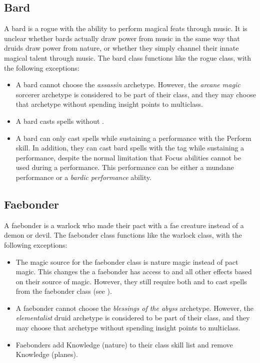     \subsection{Bard}
        A bard is a rogue with the ability to perform magical feats through music.
        It is unclear whether bards actually draw power from music in the same way that druids draw power from nature, or whether they simply channel their innate magical talent through music.
        The bard class functions like the rogue class, with the following exceptions:
        \begin{itemize}
            \item A bard cannot choose the \textit{assassin} archetype. However, the \textit{arcane magic} sorcerer archetype is considered to be part of their class, and they may choose that archetype without spending insight points to multiclass.
            \item A bard casts spells without .
            \item A bard can only cast spells while sustaining a performance with the Perform skill. In addition, they can cast bard spells with the  tag while sustaining a performance, despite the normal limitation that Focus abilities cannot be used during a performance. This performance can be either a mundane performance or a \textit{bardic performance} ability.
        \end{itemize}

    \subsection{Faebonder}
        A faebonder is a warlock who made their pact with a fae creature instead of a demon or devil.
        The faebonder class functions like the warlock class, with the following exceptions:
        \begin{itemize}
            \item The magic source for the faebonder class is nature magic instead of pact magic.
                This changes the  a faebonder has access to and all other effects based on their source of magic.
                However, they still require both  and  to cast spells from the faebonder class (see ).
            \item A faebonder cannot choose the \textit{blessings of the abyss} archetype. However, the \textit{elementalist} druid archetype is considered to be part of their class, and they may choose that archetype without spending insight points to multiclass.
            \item Faebonders add Knowledge (nature) to their class skill list and remove Knowledge (planes).
        \end{itemize}

